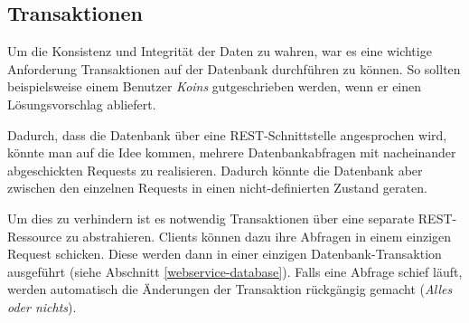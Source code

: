 \subsection{Transaktionen}
Um die Konsistenz und Integrität der Daten zu wahren, war es eine wichtige Anforderung Transaktionen auf der Datenbank durchführen zu können.
So sollten beispielsweise einem Benutzer \emph{Koins} gutgeschrieben werden, wenn er einen Lösungsvorschlag abliefert.

Dadurch, dass die Datenbank über eine \gls{REST}-Schnittstelle angesprochen wird, könnte man auf die Idee kommen, mehrere Datenbankabfragen mit nacheinander abgeschickten Requests zu realisieren.
Dadurch könnte die Datenbank aber zwischen den einzelnen Requests in einen nicht-definierten Zustand geraten.

Um dies zu verhindern ist es notwendig Transaktionen über eine separate \gls{REST}-Ressource zu abstrahieren.
Clients können dazu ihre Abfragen in einem einzigen Request schicken. Diese werden dann in einer einzigen Datenbank-Transaktion ausgeführt (siehe Abschnitt \ref{webservice-database}).
Falls eine Abfrage schief läuft, werden automatisch die Änderungen der Transaktion rückgängig gemacht (\emph{Alles oder nichts}).
